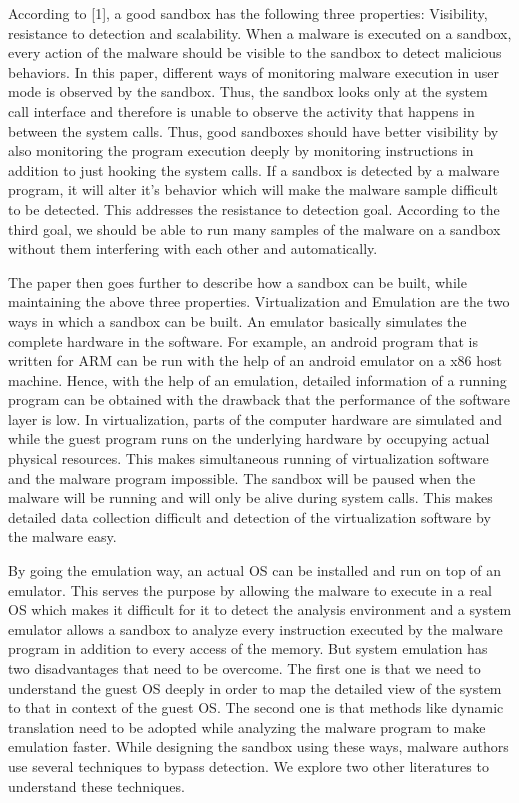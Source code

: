 \documentclass[11pt]{article}
\begin{document}
		According to [1], a good sandbox has the following three properties: Visibility, resistance to detection and scalability. When a malware is executed on a sandbox, every action of the malware should be visible to the sandbox to detect malicious behaviors. In this paper, different ways of monitoring malware execution in user mode is observed by the sandbox. Thus, the sandbox looks only at the system call interface and therefore is unable to observe the activity that happens in between the system calls. Thus, good sandboxes should have better visibility by also monitoring the program execution deeply by monitoring instructions in addition to just hooking the system calls. If a sandbox is detected by a malware program, it will alter it’s behavior which will make the malware sample difficult to be detected. This addresses the resistance to detection goal. According to the third goal, we should be able to run many samples of the malware on a sandbox without them interfering with each other and automatically.

		The paper then goes further to describe how a sandbox can be built, while maintaining the above three properties. Virtualization and Emulation are the two ways in which a sandbox can be built. An emulator basically simulates the complete hardware in the software. For example, an android program that is written for ARM can be run with the help of an android emulator on a x86 host machine. Hence, with the help of an emulation, detailed information of a running program can be obtained with the drawback that the performance of the software layer is low. In virtualization, parts of the computer hardware are simulated and while the guest program runs on the underlying hardware by occupying actual physical resources. This makes simultaneous running of virtualization software and the malware program impossible. The sandbox will be paused when the malware will be running and will only be alive during system calls. This makes detailed data collection difficult and detection of the virtualization software by the malware easy.

		By going the emulation way, an actual OS can be installed and run on top of an emulator. This serves the purpose by allowing the malware to execute in a real OS which makes it difficult for it to detect the analysis environment and a system emulator allows a sandbox to analyze every instruction executed by the malware program in addition to every access of the memory. But system emulation has two disadvantages that need to be overcome. The first one is that we need to understand the guest OS deeply in order to map the detailed view of the system to that in context of the guest OS. The second one is that methods like dynamic translation need to be adopted while analyzing the malware program to make emulation faster. While designing the sandbox using these ways, malware authors use several techniques to bypass detection. We explore two other literatures to understand these techniques.
		
\end{document}
